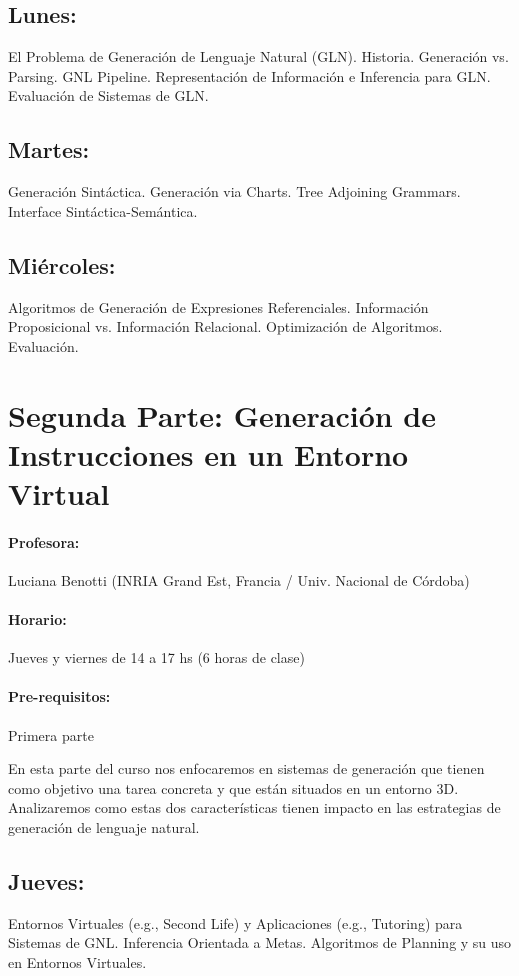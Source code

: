\documentclass[a4paper]{article}
\begin{document}
\subsection*{Lunes:} El Problema de Generaci\'on de Lenguaje Natural (GLN). Historia. Generaci\'on vs. Parsing. GNL Pipeline. Representaci\'on de Informaci\'on e Inferencia para GLN. Evaluaci\'on de Sistemas de GLN.

\subsection*{Martes:} Generaci\'on Sint\'actica. Generaci\'on via Charts. Tree Adjoining Grammars. Interface Sint\'actica-Sem\'antica.

\subsection*{Mi\'ercoles:} Algoritmos de Generaci\'on de Expresiones Referenciales. Informaci\'on Proposicional vs. Informaci\'on Relacional. Optimizaci\'on de Algoritmos. Evaluaci\'on.


\section*{Segunda Parte: Generaci\'on de Instrucciones en un Entorno Virtual}

\paragraph{Profesora:} Luciana Benotti (INRIA Grand Est, Francia / Univ. Nacional de C\'ordoba)

\paragraph{Horario:} Jueves y viernes de 14 a 17 hs (6 horas de clase)

\paragraph{Pre-requisitos:} Primera parte

En esta parte del curso nos enfocaremos en sistemas de generaci\'on que tienen como objetivo una tarea concreta y que est\'an situados en un entorno 3D. Analizaremos como estas dos caracter\'isticas tienen impacto en las estrategias de generaci\'on de lenguaje natural.

\subsection*{Jueves:} Entornos Virtuales (e.g., Second Life) y Aplicaciones (e.g., Tutoring) para Sistemas de GNL. Inferencia Orientada a Metas. Algoritmos de Planning y su uso en Entornos Virtuales.
\end{document}
